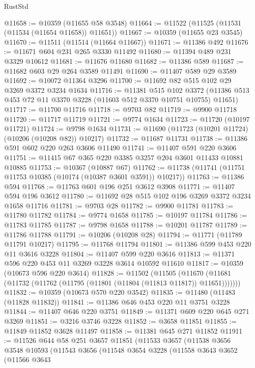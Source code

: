 \begin{lexlean}{RustStd}
\begin{coremodule}
@11658 := @10359 (@11655 @58 @3548)
@11664 := @11522 (@11525 (@11531 (@11534 (@11654 @11658)) @11651))
@11667 := @10359 (@11655 @23 @3545)
@11670 := @11511 (@11514 (@11664 @11667))
@11671 := @11386 @492
@11676 := @11671 @604 @231 @265 @3330 @11492
@11680 := @11394 @489 @231 @3329 @10612
@11681 := @11676 @11680
@11682 := @11386 @589
@11687 := @11682 @603 @29 @264 @3589 @11491
@11690 := @11407 @589 @29 @3589
@11692 := @10072 @11364 @3296
@11700 := @11692 @82 @515 @102 @29 @3269 @3372 @3234 @1634
@11716 := @11381
    @515
    @102
    @3372
    (@11386 @513 @453 @72 @11 @3370 @3228 (@11603 @512 @3370 @10751 @10755) @11651)
@11717 := @11700 @11716
@11718 := @9703 @82
@11719 := @9900 @11718
@11720 := @11717 @11719
@11721 := @9774 @1634
@11723 := @11720 (@10197 @11721)
@11724 := @9798 @1634
@11731 := @11690 (@11723 (@10201 @11724) (@10206 (@10208 @82)) @10217)
@11732 := @11687 @11731
@11738 := @11386 @591 @602 @220 @263 @3606 @11490
@11741 := @11407 @591 @220 @3606
@11751 := @11415 @67 @365 @220 @3385 @3257 @204 @3601 @11433 @10881 @10885
@11753 := @10367 (@10887 @67)
@11762 := @11738 (@11741 (@11751 @11753 @10385 (@10174 (@10387 @3601 @3591)) @10217))
@11763 := @11386 @594
@11768 := @11763 @601 @196 @251 @3612 @3908
@11771 := @11407 @594 @196 @3612
@11780 := @11692 @28 @515 @102 @196 @3269 @3372 @3234 @1658 @11716
@11781 := @9703 @28
@11782 := @9900 @11781
@11783 := @11780 @11782
@11784 := @9774 @1658
@11785 := @10197 @11784
@11786 := @11783 @11785
@11787 := @9798 @1658
@11788 := @10201 @11787
@11789 := @11786 @11788
@11791 := @10206 (@10208 @28)
@11794 := @11771 (@11789 @11791 @10217)
@11795 := @11768 @11794
@11801 := @11386 @599 @453 @220 @11 @3616 @3228
@11804 := @11407 @599 @220 @3616
@11813 := @11371 @596 @220 @453 @11 @3269 @3228 @3614 @10592 @11610
@11817 := @10359 (@10673 @596 @220 @3614)
@11828 := @11502
    (@11505 (@11670 (@11681 (@11732 (@11762 (@11795 (@11801 (@11804 (@11813 @11817)) @11651)))))))
@11832 := @10359 (@10673 @570 @220 @3542)
@11835 := @11480 (@11483 (@11828 @11832))
@11841 := @11386 @646 @453 @220 @11 @3751 @3228
@11844 := @11407 @646 @220 @3751
@11849 := @11371 @609 @220 @645 @271 @3269
@11851 := @3216 @3746 @3228
@11852 := @3658 @11851
@11855 := @11849 @11852 @3628 @11497
@11858 := @11381 @645 @271 @11852
@11911 := @11526
    @644
    @58
    @251
    @3657
    @11851
    (@11533
      @3657
      (@11538
        @3656
        @3548
        @10593
        (@11543
          @3656
          (@11548
            @3654
            @3228
            (@11558
              @3643
              @3652
              (@11566
                @3643

\end{coremodule}
\end{lexlean}
